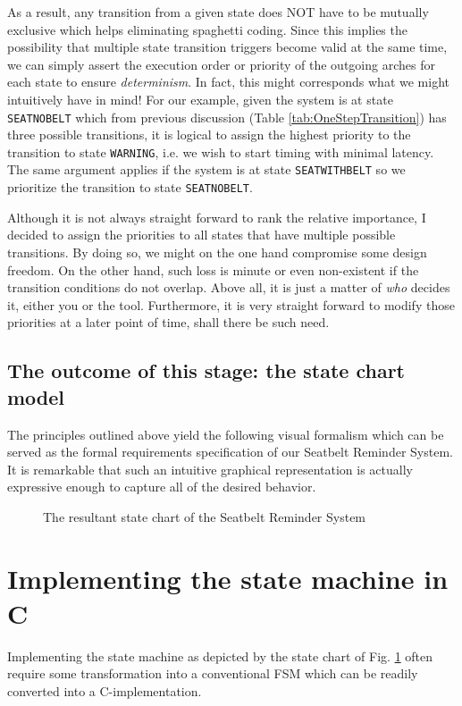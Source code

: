\documentclass[12pt,a4paper]{scrartcl}
\begin{document}
	As a result, any transition from a given state does NOT have to be mutually exclusive which helps eliminating spaghetti coding. 
	Since this implies the possibility that multiple state transition triggers become valid at the same time, 
	we can simply assert the execution order or priority of the outgoing arches for each state to ensure \textit{determinism}.
	In fact, this might corresponds what we might intuitively have in mind!
	For our example, given the system is at state \texttt{SEAT\textunderscore NO\textunderscore BELT}
	which from previous discussion (Table \ref{tab:OneStepTransition}) has three possible transitions,
	it is logical to assign the highest priority to the transition to state \texttt{WARNING},
	i.e. we wish to start timing with minimal latency.
	The same argument applies if the system is at state	\texttt{SEAT\textunderscore WITH\textunderscore BELT}
	so we prioritize the transition to state \texttt{SEAT\textunderscore NO\textunderscore BELT}.
	
	Although it is not always straight forward to rank the relative importance, I decided to assign the priorities to all states that have multiple possible transitions.
	By doing so, we might on the one hand compromise some design freedom. On the other hand, such loss is minute or even non-existent if the transition conditions do not overlap.
	Above all, it is just a matter of \textit{who} decides it, either you or the tool. Furthermore, it is very straight forward to modify those priorities at a later point of time, shall there be such need.

	\subsection{The outcome of this stage: the state chart model}
	The principles outlined above yield the following visual formalism which can be served as the formal requirements specification of our Seatbelt Reminder System. 
	It is remarkable that such an intuitive graphical representation is actually expressive enough to capture all of the desired behavior.
	\begin{figure}[H]
		\centering
		
		\caption{The resultant state chart of the Seatbelt Reminder System}
		\label{fig:myUMLStateMC}
	\end{figure}
	

\section{Implementing the state machine in C} \label{sec:FSM_in_C}
	Implementing the state machine as depicted by the state chart of Fig. \ref{fig:myUMLStateMC} often require some transformation into a conventional FSM which can be readily converted into a C-implementation.
	
\end{document}
